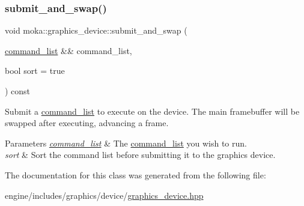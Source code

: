 \subsubsection{\texorpdfstring{submit\_and\_swap()}{submit\_and\_swap()}}
{\footnotesize\ttfamily void moka\+::graphics\+\_\+device\+::submit\+\_\+and\+\_\+swap (\begin{DoxyParamCaption}\item[{\mbox{\hyperlink{classmoka_1_1command__list}{command\+\_\+list}} \&\&}]{command\+\_\+list,  }\item[{bool}]{sort = {\ttfamily true} }\end{DoxyParamCaption}) const}



Submit a \mbox{\hyperlink{classmoka_1_1command__list}{command\+\_\+list}} to execute on the device. The main framebuffer will be swapped after executing, advancing a frame. 


\begin{DoxyParams}{Parameters}
{\em \mbox{\hyperlink{classmoka_1_1command__list}{command\+\_\+list}}} & The \mbox{\hyperlink{classmoka_1_1command__list}{command\+\_\+list}} you wish to run. \\
\hline
{\em sort} & Sort the command list before submitting it to the graphics device. \\
\hline
\end{DoxyParams}


The documentation for this class was generated from the following file\+:\begin{DoxyCompactItemize}
\item 
engine/includes/graphics/device/\mbox{\hyperlink{graphics__device_8hpp}{graphics\+\_\+device.\+hpp}}\end{DoxyCompactItemize}
